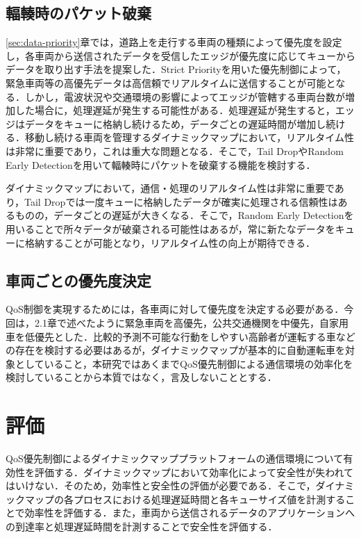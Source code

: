\documentclass[a4paper,10pt,twocolumn,uplatex]{jsarticle}
\begin{document}
\subsection{輻輳時のパケット破棄}
\ref{sec:data-priority}章では，道路上を走行する車両の種類によって優先度を設定し，各車両から送信されたデータを受信したエッジが優先度に応じてキューからデータを取り出す手法を提案した．Strict Priorityを用いた優先制御によって，緊急車両等の高優先データは高信頼でリアルタイムに送信することが可能となる．しかし，電波状況や交通環境の影響によってエッジが管轄する車両台数が増加した場合に，処理遅延が発生する可能性がある．処理遅延が発生すると，エッジはデータをキューに格納し続けるため，データごとの遅延時間が増加し続ける．移動し続ける車両を管理するダイナミックマップにおいて，リアルタイム性は非常に重要であり，これは重大な問題となる．そこで，Tail DropやRandom Early Detectionを用いて輻輳時にパケットを破棄する機能を検討する．\par
ダイナミックマップにおいて，通信・処理のリアルタイム性は非常に重要であり，Tail Dropでは一度キューに格納したデータが確実に処理される信頼性はあるものの，データごとの遅延が大きくなる．そこで，Random Early Detectionを用いることで所々データが破棄される可能性はあるが，常に新たなデータをキューに格納することが可能となり，リアルタイム性の向上が期待できる．

\subsection{車両ごとの優先度決定}
QoS制御を実現するためには，各車両に対して優先度を決定する必要がある．今回は，2.1章で述べたように緊急車両を高優先，公共交通機関を中優先，自家用車を低優先とした．比較的予測不可能な行動をしやすい高齢者が運転する車などの存在を検討する必要はあるが，ダイナミックマップが基本的に自動運転車を対象としていること，本研究ではあくまでQoS優先制御による通信環境の効率化を検討していることから本質ではなく，言及しないこととする．

\section{評価}
QoS優先制御によるダイナミックマッププラットフォームの通信環境について有効性を評価する．ダイナミックマップにおいて効率化によって安全性が失われてはいけない．そのため，効率性と安全性の評価が必要である．そこで，ダイナミックマップの各プロセスにおける処理遅延時間と各キューサイズ値を計測することで効率性を評価する．また，車両から送信されるデータのアプリケーションへの到達率と処理遅延時間を計測することで安全性を評価する．
\end{document}
